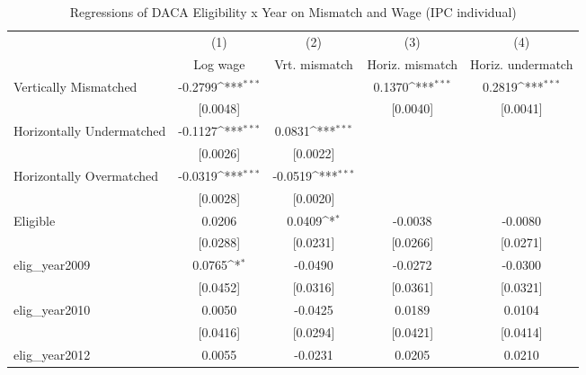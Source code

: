 \begin{table}[htbp]\centering
\def\sym#1{\ifmmode^{#1}\else\(^{#1}\)\fi}
\caption{Regressions of DACA Eligibility x Year on Mismatch and Wage (IPC individual)}
\begin{tabular}{l*{4}{c}}
\toprule
                    &\multicolumn{1}{c}{(1)}         &\multicolumn{1}{c}{(2)}         &\multicolumn{1}{c}{(3)}         &\multicolumn{1}{c}{(4)}         \\
                    &    Log wage         &Vrt. mismatch         &Horiz. mismatch         &Horiz. undermatch         \\
\midrule
Vertically Mismatched&     -0.2799\sym{***}&                     &      0.1370\sym{***}&      0.2819\sym{***}\\
                    &    [0.0048]         &                     &    [0.0040]         &    [0.0041]         \\
\addlinespace
Horizontally Undermatched&     -0.1127\sym{***}&      0.0831\sym{***}&                     &                     \\
                    &    [0.0026]         &    [0.0022]         &                     &                     \\
\addlinespace
Horizontally Overmatched&     -0.0319\sym{***}&     -0.0519\sym{***}&                     &                     \\
                    &    [0.0028]         &    [0.0020]         &                     &                     \\
\addlinespace
Eligible            &      0.0206         &      0.0409\sym{*}  &     -0.0038         &     -0.0080         \\
                    &    [0.0288]         &    [0.0231]         &    [0.0266]         &    [0.0271]         \\
\addlinespace
elig\_year2009       &      0.0765\sym{*}  &     -0.0490         &     -0.0272         &     -0.0300         \\
                    &    [0.0452]         &    [0.0316]         &    [0.0361]         &    [0.0321]         \\
\addlinespace
elig\_year2010       &      0.0050         &     -0.0425         &      0.0189         &      0.0104         \\
                    &    [0.0416]         &    [0.0294]         &    [0.0421]         &    [0.0414]         \\
\addlinespace
elig\_year2012       &      0.0055         &     -0.0231         &      0.0205         &      0.0210         \\

\end{tabular}
\end{table}
